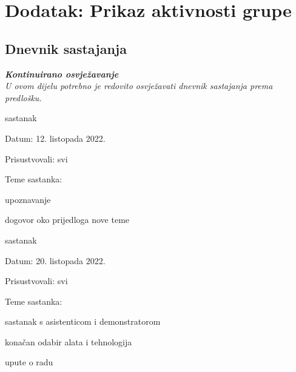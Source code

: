 \chapter*{Dodatak: Prikaz aktivnosti grupe}
		
		\section*{Dnevnik sastajanja}
		
		\textbf{\textit{Kontinuirano osvježavanje}}\\
		
		 \textit{U ovom dijelu potrebno je redovito osvježavati dnevnik sastajanja prema predlošku.}
		
		\begin{packed_enum}
			\item  sastanak
			\item[] \begin{packed_item}
				\item Datum: 12. listopada 2022.
				\item Prisustvovali: svi
				\item Teme sastanka:
				\begin{packed_item}
					\item  upoznavanje
					\item  dogovor oko prijedloga nove teme
				\end{packed_item}
			\end{packed_item}
			
			\item  sastanak
			\item[] \begin{packed_item}
				\item Datum: 20. listopada 2022.
				\item Prisustvovali: svi
				\item Teme sastanka:
				\begin{packed_item}
					\item  sastanak s asistenticom i demonstratorom
					\item  konačan odabir alata i tehnologija
					\item upute o radu
				\end{packed_item}
			\end{packed_item}
		

\end{packed_enum}
